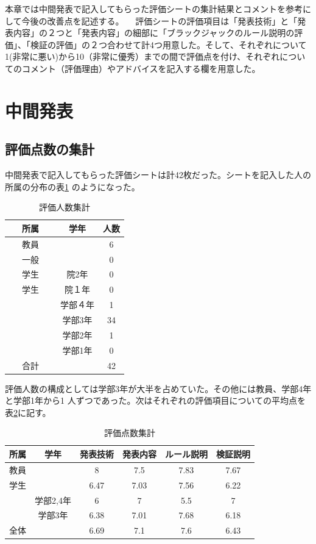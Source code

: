  本章では中間発表で記入してもらった評価シートの集計結果とコメントを参考にして今後の改善点を記述する。
　評価シートの評価項目は「発表技術」と「発表内容」の２つと「発表内容」の細部に「ブラックジャックのルール説明の評価」、「検証の評価」の２つ合わせて計4つ用意した。そして、それぞれについて1(非常に悪い)から10（非常に優秀）までの間で評価点を付け、それぞれについてのコメント（評価理由）やアドバイスを記入する欄を用意した。
\section{中間発表}
\subsection{評価点数の集計}
中間発表で記入してもらった評価シートは計42枚だった。シートを記入した人の所属の分布の表\ref{tab:dist} のようになった。

\begin{table}[htb]
  \begin{center}
    \caption{評価人数集計}
    \begin{tabular}{|c|c|c|} \hline 
      所属 & 学年 & 人数  \\ \hline \hline
      教員 &  & 6  \\
      一般 &  & 0 \\
      学生 & 院2年 & 0 \\
     学生 & 院１年 & 0 \\
             & 学部４年 & 1 \\
 　　　　　 & 学部3年 & 34 \\
             & 学部2年 & 1 \\
             & 学部1年 & 0 \\ \hline \hline
      合計 &  & 42 \\ \hline
    \end{tabular}
    \label{tab:dist}
  \end{center}
\end{table}

評価人数の構成としては学部3年が大半を占めていた。その他には教員、学部4年と学部1年から1
人ずつであった。次はそれぞれの評価項目についての平均点を表\ref{tab:point}に記す。

\begin{table}[H]
\begin{center}
\caption{評価点数集計}
\begin{tabular}{|c|c|c|c|c|c|} \hline
  所属 & 学年 & 発表技術 & 発表内容 & ルール説明 & 検証説明  \\ \hline \hline
  教員 &        & 8 & 7.5 & 7.83 & 7.67 \\
  学生 &        & 6.47 & 7.03 & 7.56 & 6.22 \\
         & 学部2,4年 & 6 & 7 & 5.5 & 7 \\
         & 学部3年 & 6.38 & 7.01 & 7.68 & 6.18 \\ \hline \hline
  全体 &        & 6.69 & 7.1 & 7.6 & 6.43 \\ \hline
\end{tabular}
\label{tab:point}
\end{center}
\end{table}

